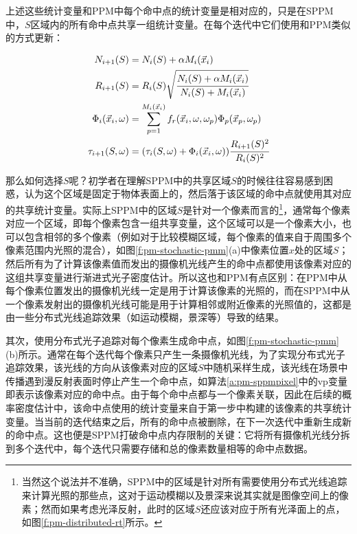 上述这些统计变量和PPM中每个命中点的统计变量是相对应的，只是在SPPM中，$S$区域内的所有命中点共享一组统计变量。在每个迭代中它们使用和PPM类似的方式更新：

\begin{equation}\label{e:pm-shared-statistics}
\begin{aligned}
	N_{i+1}(S) &=N_i(S)+\alpha M_i(\vec{x}_i)\\
	R_{i+1}(S) &=R_i(S)\sqrt{ \cfrac{N_i(S)+\alpha M_i(\vec{x}_i)}{N_i(S)+M_i(\vec{x}_i)}}\\
	\Phi_i(\vec{x}_i,{\omega})&=\sum^{M_i(\vec{x}_i)}_{p=1}f_r(\vec{x}_i,{\omega},{\omega}_p)\Phi_p(\vec{x}_p,{\omega}_p)\\
	\tau_{i+1}(S,{\omega})&=(\tau_{i}(S,{\omega})+\Phi_i(\vec{x}_i,{\omega})) \cfrac{R_{i+1}(S)^{2}}{R_i (S)^{2}}
\end{aligned}
\end{equation}

那么如何选择$S$呢？初学者在理解SPPM中的共享区域$S$的时候往往容易感到困惑，认为这个区域是固定于物体表面上的，然后落于该区域的命中点就使用其对应的共享统计变量。实际上SPPM中的区域$S$是针对一个像素而言的\footnote{当然这个说法并不准确，SPPM中的区域是针对所有需要使用分布式光线追踪来计算光照的那些点，这对于运动模糊以及景深来说其实就是图像空间上的像素；然而如果考虑光泽反射，此时的区域$S$还应该对应于所有光泽面上的点，如图\ref{f:pm-distributed-rt}所示。}，通常每个像素对应一个区域，即每个像素包含一组共享变量，这个区域可以是一个像素大小，也可以包含相邻的多个像素（例如对于比较模糊区域，每个像素的值来自于周围多个像素范围内光照的混合），如图\ref{f:pm-stochastic-pmm}(a)中像素位置$x$处的区域$S$；然后所有为了计算该像素值而发出的摄像机光线产生的命中点都使用该像素对应的这组共享变量进行渐进式光子密度估计。所以这也和PPM有点区别：在PPM中从每个像素位置发出的摄像机光线一定是用于计算该像素的光照的，而在SPPM中从一个像素发射出的摄像机光线可能是用于计算相邻或附近像素的光照值的，这都是由一些分布式光线追踪效果（如运动模糊，景深等）导致的结果。

其次，使用分布式光子追踪对每个像素生成命中点，如图\ref{f:pm-stochastic-pmm}(b)所示。通常在每个迭代每个像素只产生一条摄像机光线，为了实现分布式光子追踪效果，该光线的方向从该像素对应的区域$S$中随机采样生成，该光线在场景中传播遇到漫反射表面时停止产生一个命中点，如算法\ref{a:pm-sppmpixel}中的vp变量即表示该像素对应的命中点。由于每个命中点都与一个像素关联，因此在后续的概率密度估计中，该命中点使用的统计变量来自于第一步中构建的该像素的共享统计变量。当当前的迭代结束之后，所有的命中点被删除，在下一次迭代中重新生成新的命中点。这也便是SPPM打破命中点内存限制的关键：它将所有摄像机光线分拆到多个迭代中，每个迭代只需要存储和总的像素数量相等的命中点数据。

